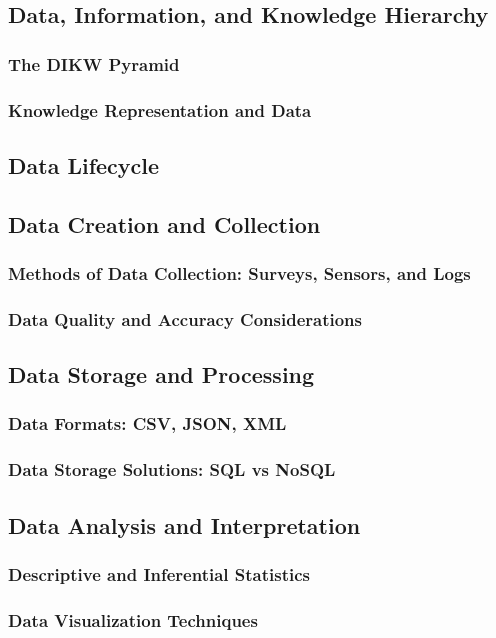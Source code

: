 \documentclass[12pt, oneside]{book}
\begin{document}
\subsection{Data, Information, and Knowledge Hierarchy}
\subsubsection{The DIKW Pyramid}
\subsubsection{Knowledge Representation and Data}
\subsection{Data Lifecycle}
\subsection{Data Creation and Collection}
\subsubsection{Methods of Data Collection: Surveys, Sensors, and Logs}
\subsubsection{Data Quality and Accuracy Considerations}
\subsection{Data Storage and Processing}
\subsubsection{Data Formats: CSV, JSON, XML}
\subsubsection{Data Storage Solutions: SQL vs NoSQL}
\subsection{Data Analysis and Interpretation}
\subsubsection{Descriptive and Inferential Statistics}
\subsubsection{Data Visualization Techniques}
\end{document}
